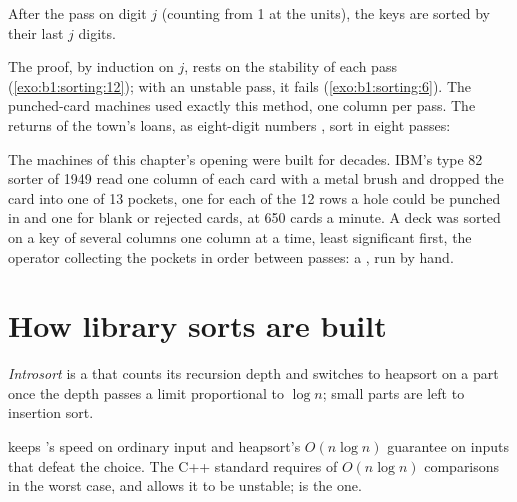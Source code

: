 \begin{proposition}\label{prop:b1:sorting:radix}
After the pass on digit $j$ (counting from 1 at the units), the keys are sorted by their last $j$ digits.
\end{proposition}

The proof, by induction on $j$, rests on the stability of each pass (\cref{exo:b1:sorting:12}); with an unstable pass,
it fails (\cref{exo:b1:sorting:6}). The punched-card machines used exactly this method, one column per pass. The
returns of the town's loans, as eight-digit numbers , sort in eight passes:

\label{out:b1:sorting:radix-loans}

\begin{history}
The machines of this chapter's opening were built for decades. IBM's type 82 sorter of 1949 read one column of each
card with a metal brush and dropped the card into one of 13 pockets, one for each of the 12 rows a hole could be
punched in and one for blank or rejected cards, at 650 cards a minute. A deck was sorted on a key of several columns
one column at a time, least significant first, the operator collecting the pockets in order between passes: a , run by hand.
\end{history}


\section{How library sorts are built}\label{sec:b1:sorting:library}

\begin{definition}[Introsort]\label{def:b1:sorting:introsort}
\emph{Introsort} is a  that counts its recursion depth and switches to heapsort on a part once
the depth passes a limit proportional to $\log n$; small parts are left to insertion sort.
\end{definition}

 keeps 's speed on ordinary input and heapsort's $O(n \log n)$ guarantee on inputs that defeat the
 choice. The C++ standard requires of  $O(n \log n)$ comparisons in the worst case, and allows it to
be unstable;  is the  one.

